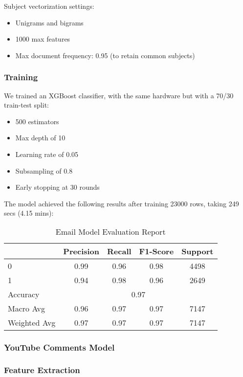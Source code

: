 \documentclass{article}
\begin{document}
Subject vectorization settings:
\begin{itemize}
    \item Unigrams and bigrams
    \item 1000 max features
    \item Max document frequency: 0.95 (to retain common subjects)
\end{itemize}

\subsubsection*{Training}
We trained an XGBoost classifier, with the same hardware but with a 70/30 train-test split:

\begin{itemize}
    \item 500 estimators
    \item Max depth of 10
    \item Learning rate of 0.05
    \item Subsampling of 0.8
    \item Early stopping at 30 rounds
\end{itemize}

\noindent
The model achieved the following results after training 23000 rows, taking 249 secs (4.15 mins):

\begin{table}[htbp]
    \centering
    \caption{Email Model Evaluation Report}
    \begin{tabular}{l c c c c}
    \toprule
     & Precision & Recall & F1-Score & Support \\
    \midrule
    0 & 0.99 & 0.96 & 0.98 & 4498 \\
    1 & 0.94 & 0.98 & 0.96 & 2649 \\
    \midrule
    Accuracy & \multicolumn{4}{c}{0.97} \\
    Macro Avg & 0.96 & 0.97 & 0.97 & 7147 \\
    Weighted Avg & 0.97 & 0.97 & 0.97 & 7147 \\
    \bottomrule
    \end{tabular}
    \label{tab:xgboost_evaluation}
\end{table}

\subsubsection{YouTube Comments Model}
\subsubsection*{Feature Extraction}
\end{document}
